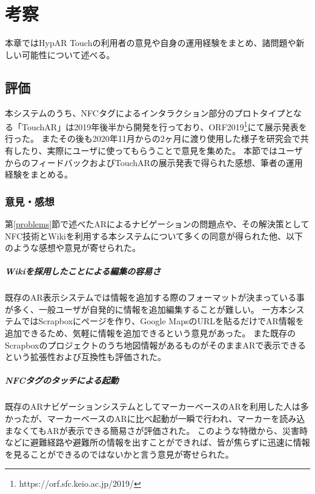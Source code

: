\chapter{考察}
\label{chap:consideration}

本章ではHypAR Touchの利用者の意見や自身の運用経験をまとめ、諸問題や新しい可能性について述べる。

\newpage


\section{評価}
本システムのうち、NFCタグによるインタラクション部分のプロトタイプとなる「TouchAR」は2019年後半から開発を行っており、ORF2019\footnote{ \textsf{https://orf.sfc.keio.ac.jp/2019/} }にて展示発表を行った。
またその後も2020年11月からの2ヶ月に渡り使用した様子を研究会で共有したり、実際にユーザに使ってもらうことで意見を集めた。
本節ではユーザからのフィードバックおよびTouchARの展示発表で得られた感想、筆者の運用経験をまとめる。

\subsection{意見・感想}

第\ref{problems}節で述べたARによるナビゲーションの問題点や、その解決策としてNFC技術とWikiを利用する本システムについて多くの同意が得られた他、以下のような感想や意見が寄せられた。


\paragraph*{Wikiを採用したことによる編集の容易さ}
既存のAR表示システムでは情報を追加する際のフォーマットが決まっている事が多く、一般ユーザが自発的に情報を追加編集することが難しい。
一方本システムではScrapboxにページを作り、Google MapsのURLを貼るだけでAR情報を追加できるため、気軽に情報を追加できるという意見があった。
また既存のScrapboxのプロジェクトのうち地図情報があるものがそのままARで表示できるという拡張性および互換性も評価された。

\paragraph*{NFCタグのタッチによる起動}
既存のARナビゲーションシステムとしてマーカーベースのARを利用した人は多かったが、マーカーベースのARに比べ起動が一瞬で行われ、マーカーを読み込まなくてもARが表示できる簡易さが評価された。
このような特徴から、災害時などに避難経路や避難所の情報を出すことができれば、皆が焦らずに迅速に情報を見ることができるのではないかと言う意見が寄せられた。

